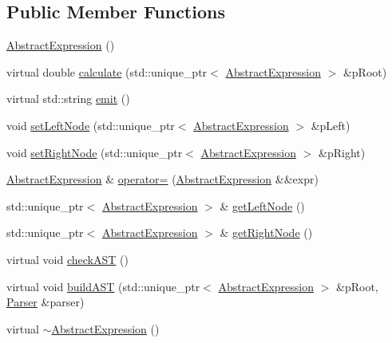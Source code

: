 \subsection*{Public Member Functions}
\begin{DoxyCompactItemize}
\item 
\mbox{\hyperlink{class_abstract_expression_a1735b3f7800dcc9a9da422ecb3cb6baf}{Abstract\+Expression}} ()
\item 
virtual double \mbox{\hyperlink{class_abstract_expression_a1c9871ee669668c2eb9f1f1a7d6f5d32}{calculate}} (std\+::unique\+\_\+ptr$<$ \mbox{\hyperlink{class_abstract_expression}{Abstract\+Expression}} $>$ \&p\+Root)
\item 
virtual std\+::string \mbox{\hyperlink{class_abstract_expression_a9f19c05e663491688cdf4423e002a391}{emit}} ()
\item 
void \mbox{\hyperlink{class_abstract_expression_a7091b8442f4b09ef967660e55cdac0e0}{set\+Left\+Node}} (std\+::unique\+\_\+ptr$<$ \mbox{\hyperlink{class_abstract_expression}{Abstract\+Expression}} $>$ \&p\+Left)
\item 
void \mbox{\hyperlink{class_abstract_expression_af958794a4a5726a021bd791456b38708}{set\+Right\+Node}} (std\+::unique\+\_\+ptr$<$ \mbox{\hyperlink{class_abstract_expression}{Abstract\+Expression}} $>$ \&p\+Right)
\item 
\mbox{\hyperlink{class_abstract_expression}{Abstract\+Expression}} \& \mbox{\hyperlink{class_abstract_expression_a7d80cc623cc5b47037fa95c052424b8f}{operator=}} (\mbox{\hyperlink{class_abstract_expression}{Abstract\+Expression}} \&\&expr)
\item 
std\+::unique\+\_\+ptr$<$ \mbox{\hyperlink{class_abstract_expression}{Abstract\+Expression}} $>$ \& \mbox{\hyperlink{class_abstract_expression_aee9ed310cda3958584c9e34a9e5af512}{get\+Left\+Node}} ()
\item 
std\+::unique\+\_\+ptr$<$ \mbox{\hyperlink{class_abstract_expression}{Abstract\+Expression}} $>$ \& \mbox{\hyperlink{class_abstract_expression_a97d5876104b7a70b66d6899a8c607b44}{get\+Right\+Node}} ()
\item 
virtual void \mbox{\hyperlink{class_abstract_expression_a703563fdf65d18ce4b7f2817e2ff4581}{check\+A\+ST}} ()
\item 
virtual void \mbox{\hyperlink{class_abstract_expression_a22801ba2c981103d20c8af71625a0b39}{build\+A\+ST}} (std\+::unique\+\_\+ptr$<$ \mbox{\hyperlink{class_abstract_expression}{Abstract\+Expression}} $>$ \&p\+Root, \mbox{\hyperlink{class_parser}{Parser}} \&parser)
\item 
virtual \mbox{\hyperlink{class_abstract_expression_a24a320f9733fb17f444432d01a3d006f}{$\sim$\+Abstract\+Expression}} ()
\end{DoxyCompactItemize}
